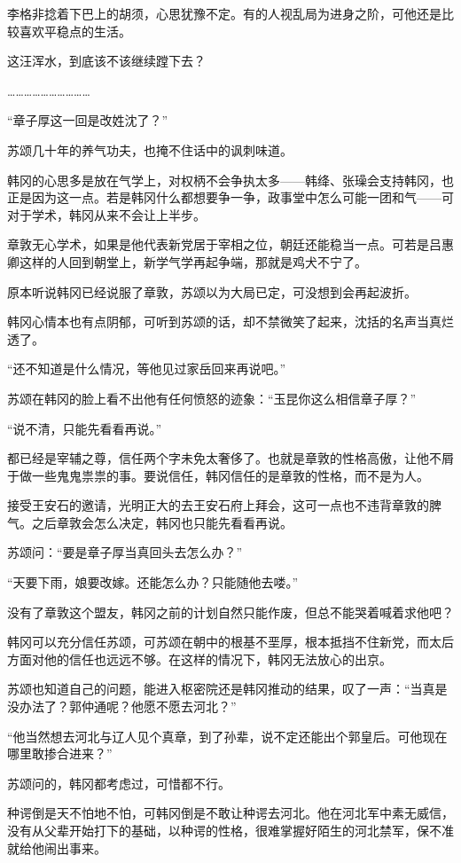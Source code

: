 李格非捻着下巴上的胡须，心思犹豫不定。有的人视乱局为进身之阶，可他还是比较喜欢平稳点的生活。

这汪浑水，到底该不该继续蹚下去？

…………………………

“章子厚这一回是改姓沈了？”

苏颂几十年的养气功夫，也掩不住话中的讽刺味道。

韩冈的心思多是放在气学上，对权柄不会争执太多——韩绛、张璪会支持韩冈，也正是因为这一点。若是韩冈什么都想要争一争，政事堂中怎么可能一团和气——可对于学术，韩冈从来不会让上半步。

章敦无心学术，如果是他代表新党居于宰相之位，朝廷还能稳当一点。可若是吕惠卿这样的人回到朝堂上，新学气学再起争端，那就是鸡犬不宁了。

原本听说韩冈已经说服了章敦，苏颂以为大局已定，可没想到会再起波折。

韩冈心情本也有点阴郁，可听到苏颂的话，却不禁微笑了起来，沈括的名声当真烂透了。

“还不知道是什么情况，等他见过家岳回来再说吧。”

苏颂在韩冈的脸上看不出他有任何愤怒的迹象：“玉昆你这么相信章子厚？”

“说不清，只能先看看再说。”

都已经是宰辅之尊，信任两个字未免太奢侈了。也就是章敦的性格高傲，让他不屑于做一些鬼鬼祟祟的事。要说信任，韩冈信任的是章敦的性格，而不是为人。

接受王安石的邀请，光明正大的去王安石府上拜会，这可一点也不违背章敦的脾气。之后章敦会怎么决定，韩冈也只能先看看再说。

苏颂问：“要是章子厚当真回头去怎么办？”

“天要下雨，娘要改嫁。还能怎么办？只能随他去喽。”

没有了章敦这个盟友，韩冈之前的计划自然只能作废，但总不能哭着喊着求他吧？

韩冈可以充分信任苏颂，可苏颂在朝中的根基不垩厚，根本抵挡不住新党，而太后方面对他的信任也远远不够。在这样的情况下，韩冈无法放心的出京。

苏颂也知道自己的问题，能进入枢密院还是韩冈推动的结果，叹了一声：“当真是没办法了？郭仲通呢？他愿不愿去河北？”

“他当然想去河北与辽人见个真章，到了孙辈，说不定还能出个郭皇后。可他现在哪里敢掺合进来？”

苏颂问的，韩冈都考虑过，可惜都不行。

种谔倒是天不怕地不怕，可韩冈倒是不敢让种谔去河北。他在河北军中素无威信，没有从父辈开始打下的基础，以种谔的性格，很难掌握好陌生的河北禁军，保不准就给他闹出事来。

